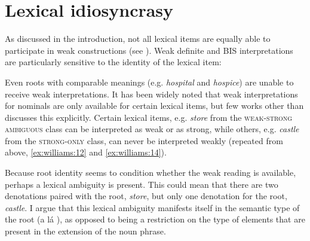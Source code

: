 \documentclass[output=paper,
modfonts
]{langscibook}
\begin{document}
\section{Lexical idiosyncrasy}\label{sec:williams:3}

As discussed in the introduction, not all lexical items are equally able to participate in  weak constructions (see ). Weak definite and BIS interpretations are particularly sensitive to the identity of the lexical item:

 \begin{exe}
\end{exe}

Even roots with comparable meanings (e.g. \textit{hospital} and \textit{hospice}) are unable to receive weak interpretations. It has been widely noted that weak interpretations for nominals are only available for certain lexical items, but few works other than \citet{BaldwinEtAlii2006} discusses this explicitly. Certain lexical items, e.g. \textit{store} from the \textsc{weak-strong ambiguous} class can be interpreted as weak or as strong, while others, e.g. \textit{castle} from the \textsc{strong-only} class, can never be interpreted weakly (repeated from above, \ref{ex:williams:12} and \ref{ex:williams:14}). 

\begin{exe}
\end{exe}

Because root identity seems to condition whether the weak reading is available, perhaps a lexical ambiguity is present. This could mean that there are two denotations paired with the root, \textit{store}, but only one denotation for the root, \textit{castle}. I argue that this lexical ambiguity manifests itself in the semantic type of the root (a l\'a \citealt{Levinson2014}), as opposed to being a restriction on the type of elements that are present in the extension of the noun phrase. 
\end{document}
